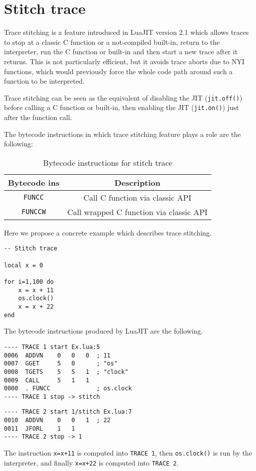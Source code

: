 \section{Stitch trace}
Trace stitching is a feature introduced in LuaJIT version 2.1 which allows traces to stop at a classic C function or a not-compiled built-in, return to the interpreter, run the C function or built-in and then start a new trace after it returns. This is not particularly efficient, but it avoids trace aborts due to NYI functions, which would previously force the whole code path around such a function to be interpreted.

Trace stitching can be seen as the equivalent of disabling the JIT (\texttt{jit.off()}) before calling a C function or built-in, then enabling the JIT (\texttt{jit.on()}) just after the function call.

The bytecode instructions in which trace stitching feature plays a role are the following:

\begin{table}[H]
    \centering
    \begin{tabular}{|c|c|}
        \hline
        Bytecode ins & Description \\
        \hline
        \texttt{FUNCC} & Call C function via classic API\\
        \texttt{FUNCCW} & Call wrapped C function via classic API\\
        \hline
    \end{tabular}
    \caption{Bytecode instructions for stitch trace}
    \label{tab:stitch-bc-ins}
\end{table}

\noindent
Here we propose a concrete example which describes trace stitching.
\begin{mdframed}[style=LuaStyleFrame]
\begin{lstlisting}[style=LuaStyle]
-- Stitch trace

local x = 0

for i=1,100 do
	x = x + 11
	os.clock()
	x = x + 22
end
\end{lstlisting}
\end{mdframed}
\noindent
The bytecode instructions produced by LuaJIT are the following.

\begin{multicols}{2}
\begin{lstlisting}[style=DumpStyle]
---- TRACE 1 start Ex.lua:5
0006  ADDVN    0   0   0  ; 11
0007  GGET     5   0      ; "os"
0008  TGETS    5   5   1  ; "clock"
0009  CALL     5   1   1
0000  . FUNCC             ; os.clock
---- TRACE 1 stop -> stitch
\end{lstlisting}

\columnbreak

\begin{lstlisting}[style=DumpStyle]
---- TRACE 2 start 1/stitch Ex.lua:7
0010  ADDVN    0   0   1  ; 22
0011  JFORL    1   1
---- TRACE 2 stop -> 1
\end{lstlisting}
\end{multicols}
\noindent
The instruction \texttt{x=x+11} is computed into \texttt{TRACE 1}, then \texttt{os.clock()} is run by the interpreter, and finally \texttt{x=x+22} is computed into \texttt{TRACE 2}.

